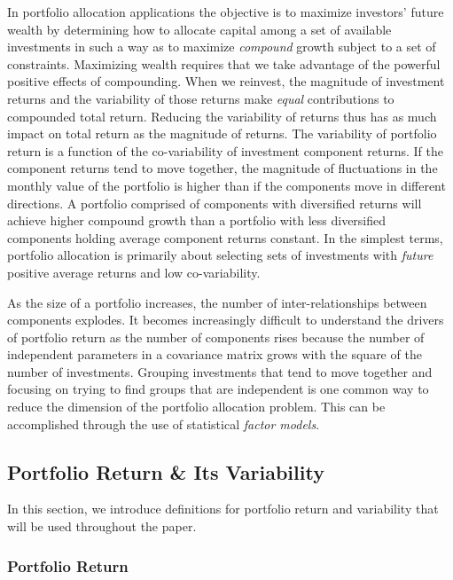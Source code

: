\documentclass[]{article}
\begin{document}
In portfolio allocation applications the objective is to maximize
investors' future wealth by determining how to allocate capital among a
set of available investments in such a way as to maximize
\emph{compound} growth subject to a set of constraints. Maximizing
wealth requires that we take advantage of the powerful positive effects
of compounding. When we reinvest, the magnitude of investment returns
and the variability of those returns make \emph{equal} contributions to
compounded total return. Reducing the variability of returns thus has as
much impact on total return as the magnitude of returns. The variability
of portfolio return is a function of the co-variability of investment
component returns. If the component returns tend to move together, the
magnitude of fluctuations in the monthly value of the portfolio is
higher than if the components move in different directions. A portfolio
comprised of components with diversified returns will achieve higher
compound growth than a portfolio with less diversified components
holding average component returns constant. In the simplest terms,
portfolio allocation is primarily about selecting sets of investments
with \emph{future} positive average returns and low co-variability.

As the size of a portfolio increases, the number of inter-relationships
between components explodes. It becomes increasingly difficult to
understand the drivers of portfolio return as the number of components
rises because the number of independent parameters in a covariance
matrix grows with the square of the number of investments. Grouping
investments that tend to move together and focusing on trying to find
groups that are independent is one common way to reduce the dimension of
the portfolio allocation problem. This can be accomplished through the
use of statistical \emph{factor models}.

\subsection{Portfolio Return \& Its
Variability}\label{portfolio-return-its-variability}

In this section, we introduce definitions for portfolio return and
variability that will be used throughout the paper.

\subsubsection{Portfolio Return}\label{portfolio-return}
\end{document}
